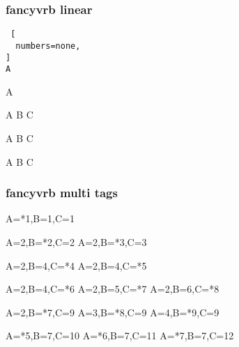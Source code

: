 \subsubsection{\textsf{fancyvrb} linear}


\begin{Verbatim} [
  numbers=none,
]
A
\end{Verbatim}

\begin{CDRBlock} [
  tags=none,
  numbers=none,
]
A
\end{CDRBlock}
\begin{CDRBlock} [
  tags=none,
  numbers=left,
  firstnumber=last,
]
A
B
C
\end{CDRBlock}
\begin{CDRBlock} [
  tags=none,
  numbers=left,
  firstnumber=last,
]
A
B
C
\end{CDRBlock}
\begin{CDRBlock} [
  tags=none,
  numbers=left,
  firstnumber=last,
]
A
B
C
\end{CDRBlock}

\subsubsection{\textsf{fancyvrb} multi tags}


\begin{CDRBlock} [
  tags={A,B,C},
  numbers=left,
  firstnumber=last,
]
A=*1,B=1,C=1
\end{CDRBlock}
\begin{CDRBlock} [
  tags={B,C},
  numbers=left,
  firstnumber=last,
]
A=2,B=*2,C=2
A=2,B=*3,C=3
\end{CDRBlock}

\begin{CDRBlock} [
  tags=C,
  numbers=left,
  firstnumber=last,
]
A=2,B=4,C=*4
A=2,B=4,C=*5
\end{CDRBlock}

\begin{CDRBlock} [
  tags={C, B},
  numbers=left,
  firstnumber=last,
]
A=2,B=4,C=*6
A=2,B=5,C=*7
A=2,B=6,C=*8
\end{CDRBlock}

\begin{CDRBlock} [
  tags={B, A},
  numbers=left,
  firstnumber=last,
]
A=2,B=*7,C=9
A=3,B=*8,C=9
A=4,B=*9,C=9
\end{CDRBlock}
\begin{CDRBlock} [
  tags={A,C},
  numbers=left,
  firstnumber=last,
]
A=*5,B=7,C=10
A=*6,B=7,C=11
A=*7,B=7,C=12
\end{CDRBlock}

